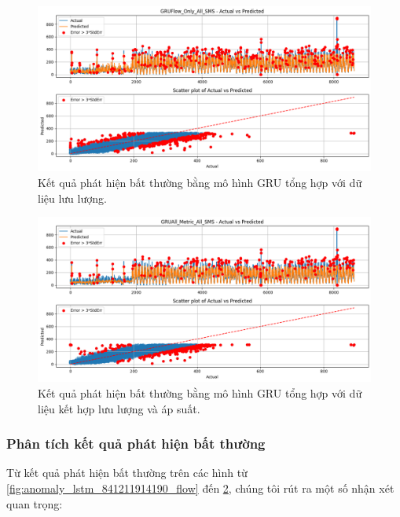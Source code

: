 \begin{figure}[htbp]
    \centering
    \includegraphics[width=\textwidth]{image/section6_3/anomaly_detection_combined_gru_flow.png}
    \caption{Kết quả phát hiện bất thường bằng mô hình GRU tổng hợp với dữ liệu lưu lượng.}
    \label{fig:anomaly_combined_gru_flow}
\end{figure}

\begin{figure}[htbp]
    \centering
    \includegraphics[width=\textwidth]{image/section6_3/anomaly_detection_combined_gru_allmetric.png}
    \caption{Kết quả phát hiện bất thường bằng mô hình GRU tổng hợp với dữ liệu kết hợp lưu lượng và áp suất.}
    \label{fig:anomaly_combined_gru_all}
\end{figure}

\subsubsection{Phân tích kết quả phát hiện bất thường}

Từ kết quả phát hiện bất thường trên các hình từ \ref{fig:anomaly_lstm_841211914190_flow} đến \ref{fig:anomaly_combined_gru_all}, chúng tôi rút ra một số nhận xét quan trọng:

